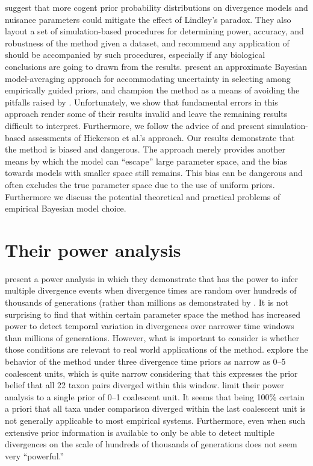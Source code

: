 \documentclass[letterpaper,12pt]{article}
\begin{document}
\begin{linenumbers}
\citet{Oaks2012} suggest that more cogent prior probability distributions on
divergence models and nuisance parameters could mitigate the effect of
Lindley's paradox.
They also layout a set of simulation-based procedures for determining power,
accuracy, and robustness of the method given a dataset, and recommend any
application of \msb should be accompanied by such procedures, especially
if any biological conclusions are going to drawn from the results.
\citet{Hickerson2013} present an approximate Bayesian model-averaging approach
for accommodating uncertainty in selecting among empirically guided priors, and
champion the method as a means of avoiding the pitfalls raised by
\citet{Oaks2012}.
Unfortunately, we show that fundamental errors in this approach render some of
their results invalid and leave the remaining results difficult to interpret.
Furthermore, we follow the advice of \citet{Oaks2012} and present
simulation-based assessments of Hickerson et al.'s \citeyear{Hickerson2013}
approach.
Our results demonstrate that the method is biased and dangerous.
The approach merely provides another means by which the model can ``escape''
large parameter space, and the bias towards models with smaller space still
remains.
This bias can be dangerous and often excludes the true parameter space due to
the use of uniform priors.
Furthermore we discuss the potential theoretical and practical problems of
empirical Bayesian model choice.

\section*{Their power analysis}
\citet{Hickerson2013} present a power analysis in which they demonstrate that
\msb has the power to infer multiple divergence events when divergence times
are random over hundreds of thousands of generations (rather than millions
as demonstrated by \citet{Oaks2012}.
It is not surprising to find that within certain parameter space the method
has increased power to detect temporal variation in divergences over narrower
time windows than millions of generations.
However, what is important to consider is whether those conditions are relevant
to real world applications of the method.
\citet{Oaks2012} explore the behavior of the method under three divergence time
priors as narrow as 0--5 coalescent units, which is quite narrow considering
that this expresses the prior belief that all 22 taxon pairs diverged within
this window.
\citet{Hickerson2013} limit their power analysis to a single prior of 0--1
coalescent unit.
It seems that being 100\% certain a priori that all taxa under comparison
diverged within the last coalescent unit is not generally applicable to most
empirical systems.
Furthermore, even when such extensive prior information is available to only be
able to detect multiple divergences on the scale of hundreds of thousands of
generations does not seem very ``powerful.''


\end{linenumbers}
\end{document}
